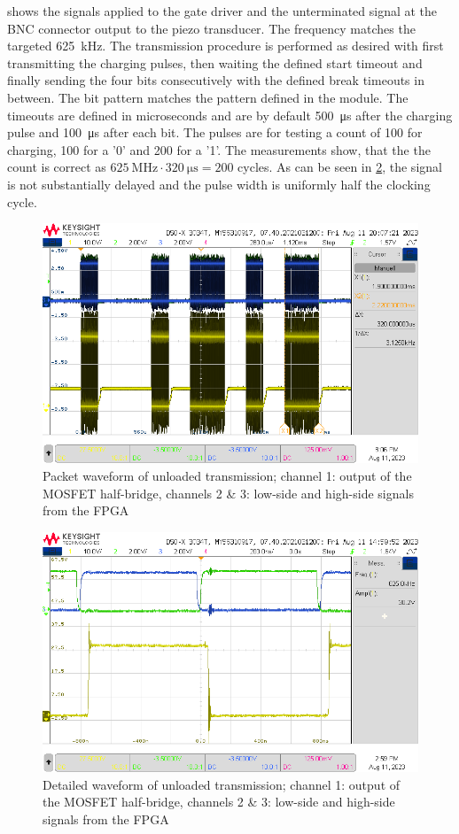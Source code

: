 \documentclass[
	english,
	ruledheaders=section, %
	class=report,%
	thesis={type=Project Seminar Report},%
	accentcolor=TUDa-1d, %
	custommargins=false,%
	marginpar=false,%
	parskip=half-,%
	fontsize=11pt,%
]{tudapub}
\begin{document}
 shows the signals applied to the gate driver and the unterminated signal at the BNC connector output to the piezo transducer.  The frequency matches the targeted \SI{625}{\kilo\hertz}.
The transmission procedure is performed as desired with first transmitting the charging pulses, then waiting the defined start timeout and finally sending the four bits consecutively with the defined break timeouts in between. The bit pattern matches the pattern defined in the module. The timeouts are defined in microseconds and are by default \SI{500}{\micro\s} after the charging pulse and \SI{100}{\micro\s} after each bit. The pulses are for testing a count of 100 for charging, 100 for a '0' and 200 for a '1'. The measurements show, that the the count is correct as $\SI{625}{\mega\hertz}\cdot\SI{320}{\micro\s} = 200$ cycles.
As can be seen in \cref{img:piezo_unbelastet2}, the signal is not substantially delayed and the pulse width is uniformly half the clocking cycle.

\begin{figure}[H]
    \centering
    \includegraphics[width=0.8\columnwidth]{images/piezo_unbelastet1.png}
    \caption{Packet waveform of unloaded transmission; channel 1: output of the MOSFET half-bridge, channels 2 \& 3: low-side and high-side signals from the FPGA}
    \label{img:piezo_unbelastet1}
\end{figure}
\begin{figure}[H]
    \centering
    \includegraphics[width=0.8\columnwidth]{images/piezo_unbelastet2.png}
    \caption{Detailed waveform of unloaded transmission; channel 1: output of the MOSFET half-bridge, channels 2 \& 3: low-side and high-side signals from the FPGA}
    \label{img:piezo_unbelastet2}
\end{figure}
\end{document}

